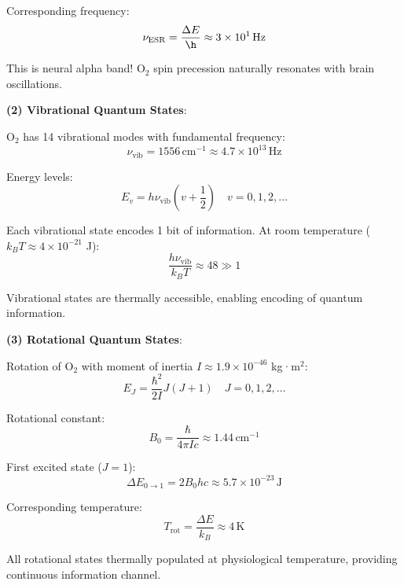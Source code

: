 \documentclass[11pt,onecolumn]{article}
\begin{document}
Corresponding frequency:
\begin{equation}
\nu_{\text{ESR}} = \frac{\Delta E}{\h} \approx 3 \times 10^{1}\,\text{Hz}
\end{equation}

This is neural alpha band! O$_2$ spin precession naturally resonates with brain oscillations.

\textbf{(2) Vibrational Quantum States}:

O$_2$ has 14 vibrational modes with fundamental frequency:
\begin{equation}
\nu_{\text{vib}} = 1556\,\text{cm}^{-1} \approx 4.7 \times 10^{13}\,\text{Hz}
\end{equation}

Energy levels:
\begin{equation}
E_v = h\nu_{\text{vib}}\left(v + \frac{1}{2}\right) \quad v = 0,1,2,\ldots
\end{equation}

Each vibrational state encodes 1 bit of information. At room temperature ($k_B T \approx 4 \times 10^{-21}$ J):
\begin{equation}
\frac{h\nu_{\text{vib}}}{k_B T} \approx 48 \gg 1
\end{equation}

Vibrational states are thermally accessible, enabling encoding of quantum information.

\textbf{(3) Rotational Quantum States}:

Rotation of O$_2$ with moment of inertia $I \approx 1.9 \times 10^{-46}$ kg·m$^2$:
\begin{equation}
E_J = \frac{\hbar^2}{2I}J(J+1) \quad J = 0,1,2,\ldots
\end{equation}

Rotational constant:
\begin{equation}
B_0 = \frac{\hbar}{4\pi I c} \approx 1.44\,\text{cm}^{-1}
\end{equation}

First excited state ($J=1$):
\begin{equation}
\Delta E_{0 \to 1} = 2B_0 hc \approx 5.7 \times 10^{-23}\,\text{J}
\end{equation}

Corresponding temperature:
\begin{equation}
T_{\text{rot}} = \frac{\Delta E}{k_B} \approx 4\,\text{K}
\end{equation}

All rotational states thermally populated at physiological temperature, providing continuous information channel.
\end{document}
